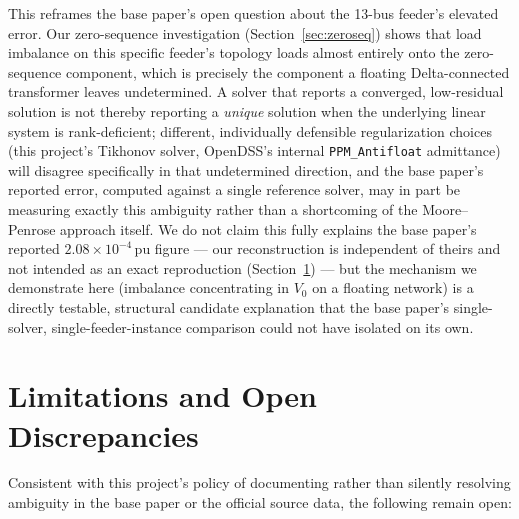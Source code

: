 \documentclass[conference]{IEEEtran}
\begin{document}
This reframes the base paper's open question about the 13-bus feeder's
elevated error. Our zero-sequence investigation (Section~\ref{sec:zeroseq})
shows that load imbalance on this specific feeder's topology loads almost
entirely onto the zero-sequence component, which is precisely the
component a floating Delta-connected transformer leaves undetermined. A
solver that reports a converged, low-residual solution is not thereby
reporting a \emph{unique} solution when the underlying linear system is
rank-deficient; different, individually defensible regularization choices
(this project's Tikhonov solver, OpenDSS's internal
\texttt{PPM\_Antifloat} admittance) will disagree specifically in that
undetermined direction, and the base paper's reported error, computed
against a single reference solver, may in part be measuring exactly this
ambiguity rather than a shortcoming of the Moore--Penrose approach itself.
We do not claim this fully explains the base paper's reported
$2.08\times10^{-4}$\,pu figure --- our reconstruction is independent of
theirs and not intended as an exact reproduction (Section~\ref{sec:limitations})
--- but the mechanism we demonstrate here (imbalance concentrating in
$V_0$ on a floating network) is a directly testable, structural candidate
explanation that the base paper's single-solver, single-feeder-instance
comparison could not have isolated on its own.

\section{Limitations and Open Discrepancies}
\label{sec:limitations}

Consistent with this project's policy of documenting rather than silently
resolving ambiguity in the base paper or the official source data, the
following remain open:
\end{document}
